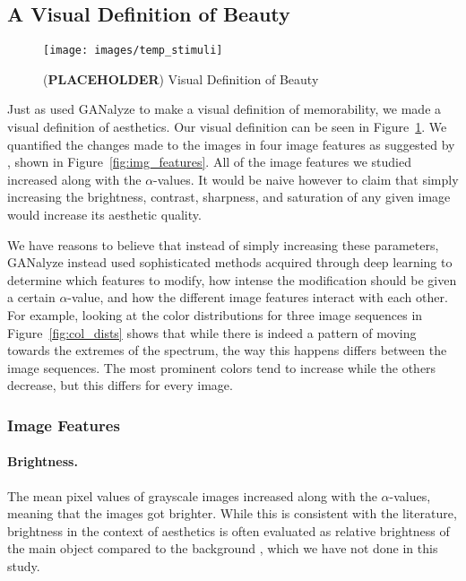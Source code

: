 \documentclass[../main.tex]{subfiles}
\begin{document}
\subsection{A Visual Definition of Beauty}
\begin{figure}[!ht]
	\caption{(\textbf{PLACEHOLDER}) Visual Definition of Beauty}
	\label{img:visual_def}
	\texttt{[image: images/temp\_stimuli]}
\end{figure}

Just as \textcite{goetschalckxGANalyzeVisualDefinitions2019} used GANalyze to make a visual definition of memorability, we made a visual definition of aesthetics. Our visual definition can be seen in Figure~\ref{img:visual_def}. We quantified the changes made to the images in four image features as suggested by \textcite{ke2006design}, shown in Figure~\ref{fig:img_features}. All of the image features we studied increased along with the $\alpha$-values. It would be naive however to claim that simply increasing the brightness, contrast, sharpness, and saturation of any given image would increase its aesthetic quality.

We have reasons to believe that instead of simply increasing these parameters, GANalyze instead used sophisticated methods acquired through deep learning to determine which features to modify, how intense the modification should be given a certain $\alpha$-value, and how the different image features interact with each other. For example, looking at the color distributions for three image sequences in Figure~\ref{fig:col_dists} shows that while there is indeed a pattern of moving towards the extremes of the spectrum, the way this happens differs between the image sequences. The most prominent colors tend to increase while the others decrease, but this differs for every image.

\subsubsection{Image Features}
\paragraph{Brightness.} The mean pixel values of grayscale images increased along with the $\alpha$-values, meaning that the images got brighter. While this is consistent with the literature, brightness in the context of aesthetics is often evaluated as relative brightness of the main object compared to the background \parencite{ke2006design, obrador2010role}, which we have not done in this study. 
\end{document}
